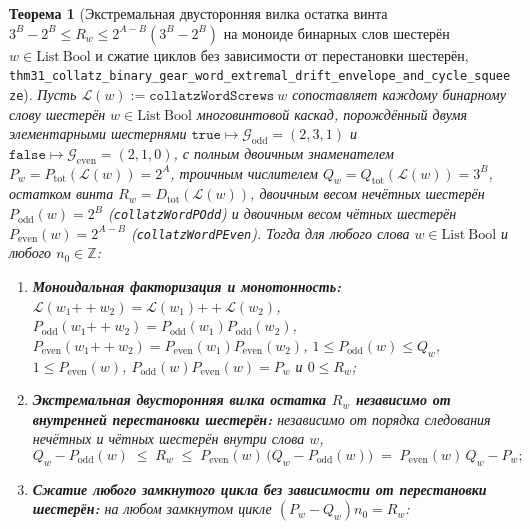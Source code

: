 \documentclass[11pt,a4paper]{article}
\newtheorem{theorem}{Теорема}[section]
\theoremstyle{definition}
\theoremstyle{remark}
\begin{document}
\begin{theorem}[Экстремальная двусторонняя вилка остатка винта $3^B - 2^B \le R_w \le 2^{A-B}(3^B - 2^B)$ на моноиде бинарных слов шестерён $w \in \mathrm{List}\ \mathrm{Bool}$ и сжатие циклов без зависимости от перестановки шестерён, \texttt{thm31\_collatz\_binary\_gear\_word\_extremal\_drift\_envelope\_and\_cycle\_squeeze}]
\label{thm:binary-gear-word-extremal-envelope}
Пусть $\mathcal{L}(w) := \texttt{collatzWordScrews}\ w$ сопоставляет каждому бинарному слову шестерён $w \in \mathrm{List}\ \mathrm{Bool}$ многовинтовой каскад, порождённый двумя элементарными шестернями $\texttt{true} \mapsto \mathcal{G}_{\mathrm{odd}}=(2,3,1)$ и $\texttt{false} \mapsto \mathcal{G}_{\mathrm{even}}=(2,1,0)$, с полным двоичным знаменателем $P_w = P_{\mathrm{tot}}(\mathcal{L}(w)) = 2^A$, троичным числителем $Q_w = Q_{\mathrm{tot}}(\mathcal{L}(w)) = 3^B$, остатком винта $R_w = D_{\mathrm{tot}}(\mathcal{L}(w))$, двоичным весом нечётных шестерён $P_{\mathrm{odd}}(w) = 2^B$ (\texttt{collatzWordPOdd}) и двоичным весом чётных шестерён $P_{\mathrm{even}}(w) = 2^{A-B}$ (\texttt{collatzWordPEven}). Тогда для любого слова $w \in \mathrm{List}\ \mathrm{Bool}$ и любого $n_0 \in \mathbb{Z}$:
\begin{enumerate}[label=\textbf{(\roman*)},leftmargin=*,noitemsep]
\item \textbf{Моноидальная факторизация и монотонность:}
  $\mathcal{L}(w_1\mathbin{++}w_2) = \mathcal{L}(w_1)\mathbin{++}\mathcal{L}(w_2)$, $P_{\mathrm{odd}}(w_1\mathbin{++}w_2) = P_{\mathrm{odd}}(w_1)P_{\mathrm{odd}}(w_2)$, $P_{\mathrm{even}}(w_1\mathbin{++}w_2) = P_{\mathrm{even}}(w_1)P_{\mathrm{even}}(w_2)$, $1 \le P_{\mathrm{odd}}(w) \le Q_w$, $1 \le P_{\mathrm{even}}(w)$, $P_{\mathrm{odd}}(w) P_{\mathrm{even}}(w) = P_w$ и $0 \le R_w$;
\item \textbf{Экстремальная двусторонняя вилка остатка $R_w$ независимо от внутренней перестановки шестерён:}
  независимо от порядка следования нечётных и чётных шестерён внутри слова $w$,
  \begin{equation}
    \label{eq:binary-gear-word-extremal-bracket}
    Q_w - P_{\mathrm{odd}}(w) \;\le\; R_w \;\le\; P_{\mathrm{even}}(w)\,\bigl(Q_w - P_{\mathrm{odd}}(w)\bigr) \;=\; P_{\mathrm{even}}(w)\,Q_w - P_w;
  \end{equation}
\item \textbf{Сжатие любого замкнутого цикла без зависимости от перестановки шестерён:}
  на любом замкнутом цикле $(P_w - Q_w) n_0 = R_w$:
  \begin{equation}
    \label{eq:binary-gear-word-cycle-squeeze}

\end{equation}
\end{enumerate}
\end{theorem}
\end{document}
